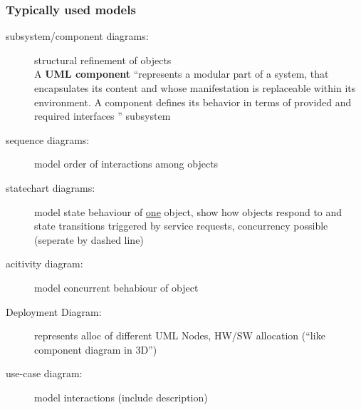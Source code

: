 \documentclass[a4paper, 10pt]{article}
\begin{document}
\subsubsection*{Typically used models}
\begin{description}
	\item[subsystem/component diagrams:] structural refinement of objects \\
	A \textbf{UML component} ``represents a modular part of a system, that encapsulates its content and whose manifestation is replaceable within its environment. A component defines its behavior in terms of provided and required interfaces
'' \follows subsystem \\
	
	\item[sequence diagrams:] model order of interactions among objects\\
	
	\item[statechart diagrams:] model state behaviour of \underline{one} object, show how objects respond to and state transitions triggered by service requests, concurrency possible (seperate by dashed line) \\
	
	\item[acitivity diagram:] model concurrent behabiour of object
	\item [Deployment Diagram:] represents alloc of different UML Nodes, HW/SW allocation (``like component diagram in 3D'')
	\item[use-case diagram:] model interactions (include description)
\end{description}
\end{document}
